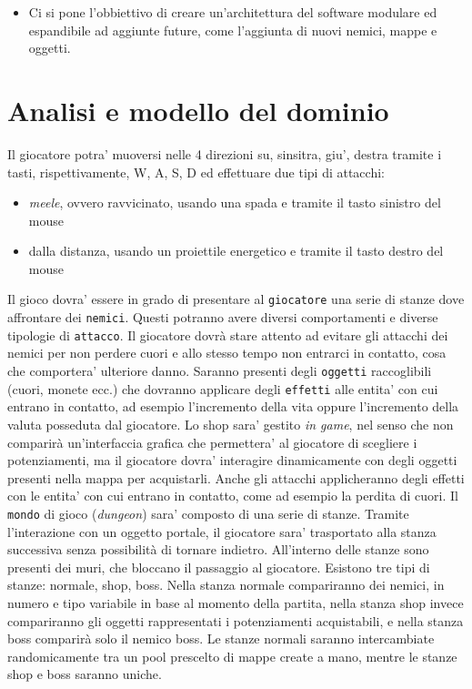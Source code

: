 \documentclass[a4paper,12pt]{report}
\begin{document}
\begin{itemize}
	\item Ci si pone l'obbiettivo di creare un'architettura del software modulare ed espandibile ad aggiunte future, come l'aggiunta di nuovi nemici, mappe e oggetti.
\end{itemize}


\section{Analisi e modello del dominio}
Il giocatore potra' muoversi nelle 4 direzioni su, sinsitra, giu', destra tramite i tasti, rispettivamente, W, A, S, D ed effettuare due tipi di attacchi:
\begin{itemize}
	\item \textit{meele}, ovvero ravvicinato, usando una spada e tramite il tasto sinistro del mouse
	\item dalla distanza, usando un proiettile energetico e tramite il tasto destro del mouse
\end{itemize}
Il gioco dovra' essere in grado di presentare al \texttt{giocatore} una serie di stanze dove affrontare dei \texttt{nemici}. Questi potranno avere diversi comportamenti e diverse tipologie di \texttt{attacco}. Il giocatore dovrà stare attento ad evitare gli attacchi dei nemici per non perdere cuori e allo stesso tempo non entrarci in contatto, cosa che comportera' ulteriore danno.
Saranno presenti degli \texttt{oggetti} raccoglibili (cuori, monete ecc.) che dovranno applicare degli \texttt{effetti} alle entita' con cui entrano in contatto, ad esempio l'incremento della vita oppure l'incremento della valuta posseduta dal giocatore. 
Lo shop sara' gestito \textit{in game}, nel senso che non comparirà un'interfaccia grafica che permettera' al giocatore di scegliere i potenziamenti, ma il giocatore dovra' interagire dinamicamente con degli oggetti presenti nella mappa per acquistarli.
Anche gli attacchi applicheranno degli effetti con le entita' con cui entrano in contatto, come ad esempio la perdita di cuori.
Il \texttt{mondo} di gioco (\textit{dungeon}) sara' composto di una serie di stanze. Tramite l'interazione con un oggetto portale, il giocatore sara' trasportato alla stanza successiva senza possibilità di tornare indietro. All'interno delle stanze sono presenti dei muri, che bloccano il passaggio al giocatore. Esistono tre tipi di stanze: normale, shop, boss. Nella stanza normale compariranno dei nemici, in numero e tipo variabile in base al momento della partita, nella stanza shop invece compariranno gli oggetti rappresentati i potenziamenti acquistabili, e nella stanza boss comparirà solo il nemico boss.
Le stanze normali saranno intercambiate randomicamente tra un pool prescelto di mappe create a mano, mentre le stanze shop e boss saranno uniche.
\end{document}
